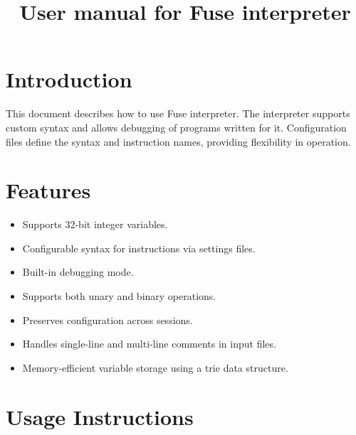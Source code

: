 \documentclass[a4paper,12pt]{article}
\title{\textbf{User manual for Fuse interpreter}}
\author{}
\date{}
\begin{document}
\maketitle

\section{Introduction}
This document describes how to use Fuse interpreter. The interpreter supports custom syntax and allows debugging of programs written for it. Configuration files define the syntax and instruction names, providing flexibility in operation.

\section{Features}
\begin{itemize}
	\item Supports 32-bit integer variables.
	\item Configurable syntax for instructions via settings files.
	\item Built-in debugging mode.
	\item Supports both unary and binary operations.
	\item Preserves configuration across sessions.
	\item Handles single-line and multi-line comments in input files.
	\item Memory-efficient variable storage using a trie data structure.
\end{itemize}

\newpage

\section{Usage Instructions}
\end{document}
